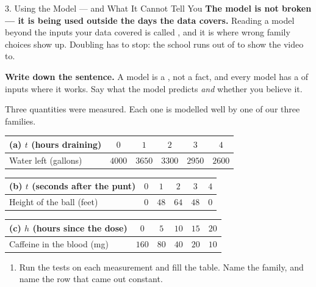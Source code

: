 \documentclass[10pt]{article}
\begin{document}
\begin{notesbox}{3. Using the Model --- and What It Cannot Tell You}
\vspace{4pt}
\textbf{The model is not broken --- it is being used outside the days the data covers.} Reading a
model beyond the inputs your data covered is called , and it is where wrong family
choices show up. Doubling has to stop: the school runs out of  to show the video to.

\vspace{4pt}
\textbf{Write down the sentence.} A model is a , not a fact, and every model has a
 of inputs where it works. Say what the model predicts \emph{and} whether you believe it.
\end{notesbox}

\vspace{0.10in}

\boxguard[30]
\begin{practicebox}
\small
Three quantities were measured. Each one is modelled well by one of our three families.

\vspace{4pt}
\renewcommand{\arraystretch}{1.3}
\begin{center}
\begin{tabular}{@{}|l|c|c|c|c|c|@{}}
\hline
\textbf{(a)} $t$ (hours draining) & $0$ & $1$ & $2$ & $3$ & $4$ \\ \hline
Water left (gallons) & $4000$ & $3650$ & $3300$ & $2950$ & $2600$ \\
\hline
\end{tabular}

\smallskip
\begin{tabular}{@{}|l|c|c|c|c|c|@{}}
\hline
\textbf{(b)} $t$ (seconds after the punt) & $0$ & $1$ & $2$ & $3$ & $4$ \\ \hline
Height of the ball (feet) & $0$ & $48$ & $64$ & $48$ & $0$ \\
\hline
\end{tabular}

\smallskip
\begin{tabular}{@{}|l|c|c|c|c|c|@{}}
\hline
\textbf{(c)} $h$ (hours since the dose) & $0$ & $5$ & $10$ & $15$ & $20$ \\ \hline
Caffeine in the blood (mg) & $160$ & $80$ & $40$ & $20$ & $10$ \\
\hline
\end{tabular}
\end{center}

\begin{enumerate}[leftmargin=1.6em, itemsep=6pt, topsep=6pt]
  \item Run the tests on each measurement and fill the table. Name the family, and name the row that
        came out constant.
\smallskip


\end{enumerate}
\end{practicebox}
\end{document}
